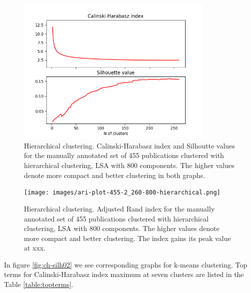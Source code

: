 \begin{figure}[ht]
  \begin{center}    
\includegraphics[width=9.5cm]{images/c-h-silh-index-plot-519-2_260-800-hierarchical.png}
    \caption{Hierarchical clustering. Calinski-Harabasz index and Silhoutte values for the
    manually annotated set of 455 publications clustered with hierarchical
    clustering, LSA with 800 components. The higher values denote 
    more compact and better clustering in both graphs.}
    \label{fig:ch-silh01}
  \end{center}
\end{figure}

\begin{figure}[ht]
  \begin{center}    
\texttt{[image: images/ari-plot-455-2\_260-800-hierarchical.png]}
    \caption{Hierarchical clustering. Adjusted Rand index for the
    manually annotated set of 455 publications clustered with hierarchical
    clustering, LSA with 800 components. The higher values denote 
    more compact and better clustering. The index gains its peak value at xxx.}
    \label{fig:ari01}
  \end{center}
\end{figure}


In figure \ref{fig:ch-silh02}
we see corresponding graphs for k-means clustering. Top terms for
Calinski-Harabasz index maximum at seven clusters are listed in 
the Table \ref{table:topterms}.


